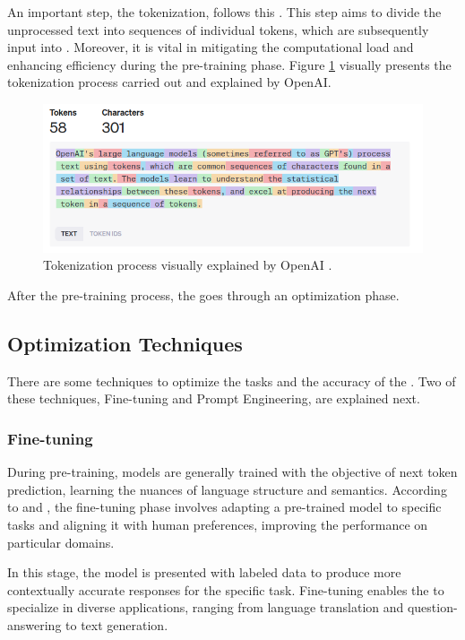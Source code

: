 An important step, the tokenization, follows this \cite{hadi_LLM_2023}. This step aims to divide the unprocessed text into sequences of individual tokens, which are subsequently input into {\llm}. Moreover, it is vital in mitigating the computational load and enhancing efficiency during the pre-training phase. Figure \ref{fig_tokenization} visually presents the tokenization process \cite{noauthor_openai_nodate} carried out and explained by OpenAI.

\begin{figure}[ht]
    \includegraphics[width=14cm]{figs/chapter2/tokenization.png}
    \centering
    \caption{Tokenization process visually explained by OpenAI \cite{noauthor_openai_nodate}.}
    \label{fig_tokenization}
\end{figure}

After the pre-training process, the {\llm} goes through an optimization phase.


\subsection{Optimization Techniques}

There are some techniques to optimize the tasks and the accuracy of the {\llm}. Two of these techniques, Fine-tuning and Prompt Engineering, are explained next.


\subsubsection{Fine-tuning}

During pre-training, models are generally trained with the objective of next token prediction, learning the nuances of language structure and semantics. According to \citet{kamnis_generative_2023} and \citet{hadi_LLM_2023}, the fine-tuning phase involves adapting a pre-trained model to specific tasks and aligning it with human preferences, improving the performance on particular domains.

In this stage, the model is presented with labeled data to produce more contextually accurate responses for the specific task. Fine-tuning enables the {\llm} to specialize in diverse applications, ranging from language translation and question-answering to text generation. 

